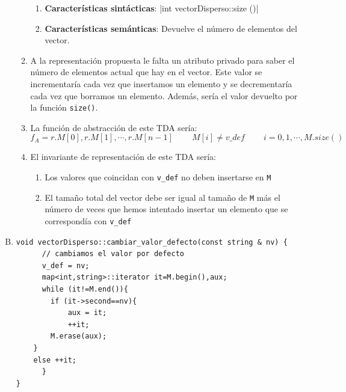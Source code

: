 \documentclass[10pt,a4paper,spanish]{report}
\begin{document}
\begin{enumerate}[A.]
\begin{enumerate}[1.]
      \begin{enumerate}
            \item \textbf{\textcolor[rgb]{0.5,0.8,1}{Características sintácticas}}: |int vectorDisperso::size ()|
            \item \textbf{\textcolor[rgb]{0.5,0.8,1}{Características semánticas}}: Devuelve el número de elementos del vector.
      \end{enumerate}
      \item A la representación propuesta le falta un atributo privado para saber el número de elementos actual que hay en el vector. Este valor se incrementaría cada vez que insertamos un elemento y se decrementaría cada vez que borramos un elemento. Además, sería el valor devuelto por la función \verb*|size()|.
      \item La función de abstracción de este TDA sería:
      \begin{displaymath}
      f_A = r.M[0], r.M[1], \cdots, r.M[n - 1] \qquad\ M[i] \neq v\_def \qquad\ i=0,1,\cdots, M.size()
      \end{displaymath}
      \item El invariante de representación de este TDA sería:
      \begin{enumerate}[---]
            \item Los valores que coincidan con \verb*|v_def| no deben insertarse en \verb*|M|
            \item El tamaño total del vector debe ser igual al tamaño de \verb*|M| más el número de veces que hemos intentado insertar un elemento que se correspondía con \verb*|v_def|
      \end{enumerate}
      \end{enumerate}

      \item

\begin{verbatim}
void vectorDisperso::cambiar_valor_defecto(const string & nv) {
      // cambiamos el valor por defecto
      v_def = nv;
      map<int,string>::iterator it=M.begin(),aux;
      while (it!=M.end()){
        if (it->second==nv){
            aux = it;
            ++it;
	    M.erase(aux);
	}
	else ++it;
      }
}
\end{verbatim}
\end{enumerate}
\end{document}
